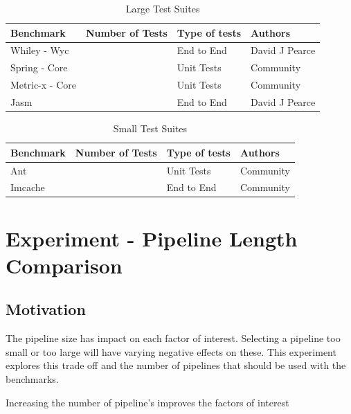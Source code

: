 \begin{table}[]
\centering

\begin{tabular}{|l|l|l|l|}
\hline
{\bf Benchmark}       &  {\bf Number of Tests} & {\bf Type of tests} & {\bf Authors}   \\ \hline
Whiley - Wyc         &       &    End to End      & David J Pearce          \\ \hline
Spring - Core   &       &    Unit Tests      & Community \\ \hline
Metric-x - Core &       &    Unit Tests      & Community \\ \hline
Jasm              &             &    End to End      & David J Pearce \\ \hline

\end{tabular}
\caption{Large Test Suites}
\label{large_test}
\end{table}

\begin{table}[]
\centering
\begin{tabular}{|l|l|l|l|}
\hline
{\bf Benchmark}   & {\bf Number of Tests} & {\bf Type of tests} & {\bf Authors}  \\ \hline
Ant             &       &    Unit Tests      & Community \\ \hline
Imcache &           &    End to End        & Community \\ \hline
\end{tabular}
\label{small_test}
\caption{Small Test Suites}
\end{table}

\section{Experiment  - Pipeline Length Comparison}
\label{sec:pipelineEva}

\subsection{Motivation}
The pipeline size has impact on each factor of interest. Selecting a pipeline too small or too large will have varying negative effects on these. This experiment explores this trade off and the number of pipelines that should be used with the benchmarks.

\begin{hyp}
Increasing the number of pipeline's improves the factors of interest
\end{hyp}

